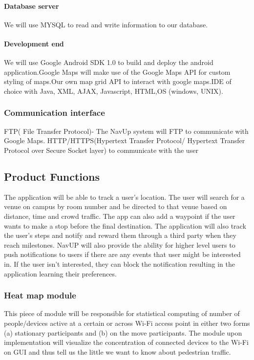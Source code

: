 \documentclass[11pt]{article}
\begin{document}
			\paragraph{Database server}	
      We will use MYSQL to read and write information to our database.

			\paragraph{Development end}
      We will use Google Android SDK 1.0 to build and deploy the android application.Google Maps will make use of the Google Maps API for custom styling of maps.Our own map grid API to interact with google maps.IDE of choice with Java, XML, AJAX, Javascript, HTML,OS (windows, UNIX).
      
		\subsubsection{Communication interface}
    FTP( File Transfer Protocol)- The NavUp system will FTP to communicate with Google Maps.
    HTTP/HTTPS(Hypertext Transfer Protocol/ Hypertext Transfer Protocol over Secure Socket layer) to communicate with the user
        
		\subsection{Product Functions}
      The application will be able to track a user’s location. The user will search for a venue on campus by room number and 			be directed to that venue based on distance, time and crowd traffic. The app can also add a waypoint if the user wants 			to make a stop before the final destination. The application will also track the user’s steps and notify and reward them 		 through a third party when they reach milestones. NavUP will also provide the ability for higher level users to push 			notifications to users if there are any events that user might be interested in. If the user isn’t interested, they can 		block the notification resulting in the application learning their preferences. 
			\subsubsection{Heat map module}
			This piece of module will be responsible for statistical computing of number of people/devices active at a certain or across Wi-Fi access point in either two forms (a) stationary participants and (b) on the move participants. The module upon implementation will visualize the concentration of connected devices to the Wi-Fi on GUI and thus tell us the little we want to know about pedestrian traffic.
\end{document}
